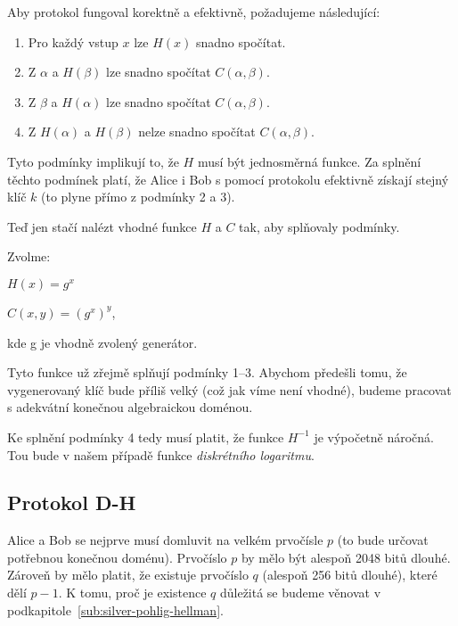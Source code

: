 \documentclass[
  program=infoi,
  biblatex,
  figures=false,
  glossaries,
  index
]{kidiplom}
\begin{document}
    Aby protokol fungoval korektně a efektivně, požadujeme následující:

    \begin{enumerate}
        \item
            Pro každý vstup $x$ lze $H(x)$ snadno spočítat.
        \item
            Z $\alpha$ a $H(\beta)$ lze snadno spočítat $C(\alpha,\beta)$.
        \item
            Z $\beta$ a $H(\alpha)$ lze snadno spočítat $C(\alpha,\beta)$.
        \item
            Z $H(\alpha)$ a $H(\beta)$ nelze snadno spočítat $C(\alpha,\beta)$.
    \end{enumerate}

    Tyto podmínky implikují to, že $H$ musí být jednosměrná funkce.
    Za splnění těchto podmínek platí, že Alice i Bob s pomocí protokolu efektivně získají
    stejný klíč $k$ (to plyne přímo z podmínky 2 a 3).

    \medskip

    Teď jen stačí nalézt vhodné funkce $H$ a $C$ tak, aby splňovaly podmínky.

    \medskip

    Zvolme:

    \begin{center}
        $H(x) = g^x$

        $C(x, y) = (g^x)^y$,

        \medskip
        kde g je vhodně zvolený generátor.
    \end{center}

    Tyto funkce už zřejmě splňují podmínky 1--3. Abychom předešli tomu, že vygenerovaný klíč bude příliš velký
    (což jak víme není vhodné), budeme pracovat s adekvátní konečnou algebraickou doménou.

    Ke splnění podmínky 4 tedy musí platit, že funkce $H^{-1}$ je výpočetně náročná.
    Tou bude v našem případě funkce \emph{diskrétního logaritmu}.


    \subsection{Protokol D-H}

        Alice a Bob se nejprve musí domluvit na velkém prvočísle $p$ (to bude určovat potřebnou konečnou doménu).
        Prvočíslo $p$ by mělo být alespoň 2048 bitů dlouhé.
        Zároveň by mělo platit, že existuje prvočíslo $q$ (alespoň 256 bitů dlouhé), které dělí $p-1$.
        K tomu, proč je existence $q$ důležitá se budeme věnovat v podkapitole~\ref{sub:silver-pohlig-hellman}.
\end{document}
